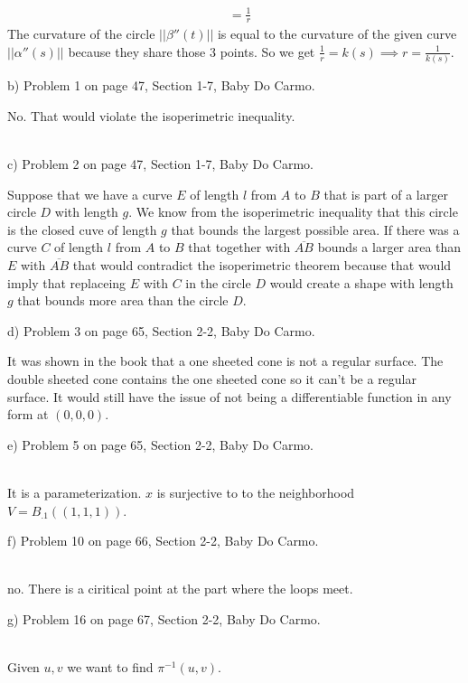 \documentclass[12pt,letterpaper,boxed]{hmcpset}
\begin{document}
\begin{itemize}
\begin{solution}
\begin{align*}
             &= \frac{1}{r}
  \end{align*}
  The curvature of the circle $||\beta''(t)||$ is equal to the curvature of the
  given curve $||\alpha''(s)||$ because they share those 3 points. So we get
  $\frac{1}{r} = k(s) \implies r = \frac{1}{k(s)}$.
\end{solution}
{\item b) Problem 1 on page 47, Section 1-7, Baby Do Carmo.}
\begin{solution}
  No. That would violate the isoperimetric inequality. \\\\
\end{solution}
{\item c) Problem 2 on page 47, Section 1-7, Baby Do Carmo.}
\begin{solution}
Suppose that we have a curve $E$ of length $l$ from $A$ to $B$ that is part of a larger circle $D$ with length $g$. We know from the isoperimetric
inequality that this circle is the closed cuve of length $g$ that bounds the
largest possible area. If there was a curve $C$ of length $l$ from $A$ to $B$ that together
with $\overline{AB}$ bounds a larger area than $E$ with $\overline{AB}$ that would
contradict the isoperimetric theorem because that would imply that replaceing
$E$ with $C$ in the circle $D$ would create a shape with length $g$ that bounds
more area than the circle $D$.
\end{solution}
{\item d) Problem 3 on page 65, Section 2-2, Baby Do Carmo.}
\begin{solution}
 It was shown in the book that a one sheeted cone is not a regular surface. The
 double sheeted cone contains the one sheeted cone so it can't be a regular
 surface.
 It would still have the issue of not being a differentiable function in any
 form at $(0, 0, 0)$.
\end{solution}
{\item e) Problem 5 on page 65, Section 2-2, Baby Do Carmo.} \\
It is a parameterization. $x$ is surjective to to the neighborhood $V =
B_{.1}((1, 1, 1))$. 
{\item f) Problem 10 on page 66, Section 2-2, Baby Do Carmo.} \\
no. There is a ciritical point at the part where the loops meet.
{\item g) Problem 16 on page 67, Section 2-2, Baby Do Carmo.}\\
Given $u, v$ we want to find $\pi^{-1}(u, v)$.

\end{itemize}
\end{document}
